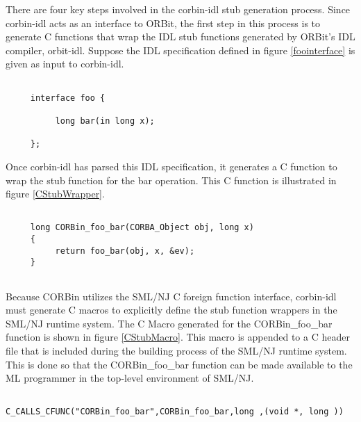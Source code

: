 There are four key steps involved in the corbin-idl stub generation process.
Since corbin-idl acts as an interface to ORBit, the first step in this 
process is to generate C functions that wrap the IDL stub functions generated 
by ORBit's IDL compiler, orbit-idl.   
Suppose the IDL specification defined in figure \ref{foointerface} 
is given as input to corbin-idl.
\begin{figure*}[t]
\singlespace
\begin{verbatim}

     interface foo {

          long bar(in long x); 

     };

\end{verbatim}
\doublespace
\caption {\em {IDL Specification for a CORBA object called foo}.}
\figline
        \label{foointerface}
\end{figure*}
Once corbin-idl has parsed this IDL specification, it generates a 
C function to wrap the stub function for the bar operation. 
This C function is illustrated in figure \ref{CStubWrapper}.
\begin{figure*}[t]
\singlespace
\begin{verbatim}

     long CORBin_foo_bar(CORBA_Object obj, long x)
     {
          return foo_bar(obj, x, &ev);
     }
 
\end{verbatim}
\doublespace
\caption {\em {C function generated by corbin-idl to invoke the bar operation of a foo object}.}
\figline
        \label{CStubWrapper}
\end{figure*}

Because CORBin utilizes the SML/NJ C foreign function interface, 
corbin-idl must generate C macros to explicitly define the stub function 
wrappers in the SML/NJ runtime system.
The C Macro generated for the CORBin\_foo\_bar function 
is shown in figure \ref{CStubMacro}.
This macro is appended to a C header file that is included during the 
building process of the SML/NJ runtime system.  This is done so that the 
CORBin\_foo\_bar function can be made available to the ML programmer
in the top-level environment of SML/NJ.
\begin{figure*}[t]
\singlespace
\begin{verbatim}

C_CALLS_CFUNC("CORBin_foo_bar",CORBin_foo_bar,long ,(void *, long ))
 
\end{verbatim}
\doublespace
\caption {\em {C Macro to explicitly define the CORBin\_foo\_bar function in the SML/NJ runtime system}.}
\figline
        \label{CStubMacro}
\end{figure*}

